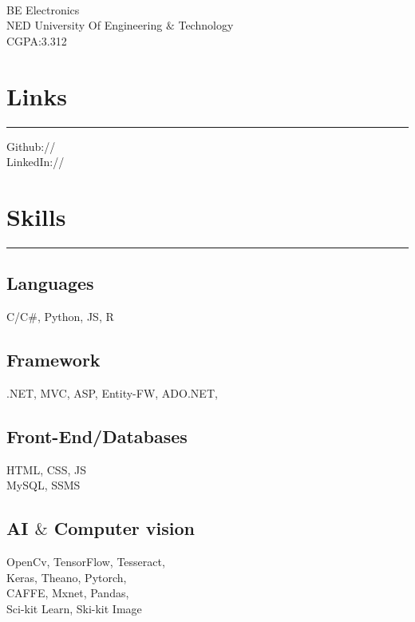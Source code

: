\documentclass[]{ShumailaAhmed-Resume}
\begin{document}
%
%

\begin{minipage}[t]{0.33\textwidth} 
\begin{large}
	\\
\end{large}
BE Electronics\\
NED University Of Engineering $\&$ Technology \\ 
CGPA:3.312
\section{Links} 
\noindent\rule{5cm}{0.4pt}

Github:// \href{https://github.com/ShumailaAhmed}{} \\
LinkedIn://  \href{https://www.linkedin.com/in/shumaila-ahmed}{} \\


\section{Skills}
\noindent\rule{5cm}{0.4pt}
\subsection{Languages}
C/C\#, Python, JS, R
\vspace{6pt}
\subsection{Framework}
.NET, MVC, ASP, Entity-FW, ADO.NET,
\vspace{6pt}
\subsection{Front-End/Databases}
HTML, CSS, JS\\
MySQL, SSMS
\vspace{6pt}
\subsection{AI $\&$ Computer vision}
OpenCv, TensorFlow, Tesseract,\\
Keras, Theano, Pytorch,\\
CAFFE, Mxnet, Pandas,\\
Sci-kit Learn, Ski-kit Image
\vspace{6pt}

\end{minipage}
\end{document}
